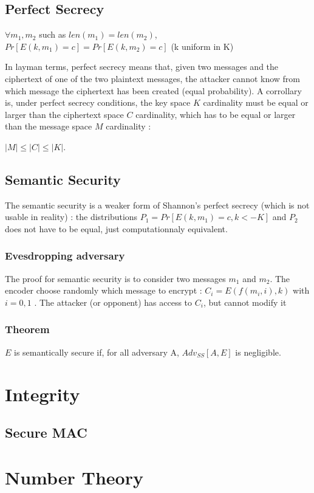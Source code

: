 \subsection{Perfect Secrecy}

\begin{mytheorem}
    $\forall m_1,m_2$ such as $len(m_1) = len(m_2)$, 
    $Pr[E(k,m_1) = c] = Pr[E(k,m_2) = c]$  \flushright (k uniform in K)
\end{mytheorem}

In layman terms, perfect secrecy means that, given two messages and the ciphertext of one of the two plaintext messages, the attacker cannot know from which message the ciphertext has been created (equal probability). A corrollary is, under perfect secrecy conditions, the key space $K$ cardinality must be equal or larger than the ciphertext space $C$ cardinality, which has to be equal or larger than the message space $M$ cardinality :
\begin{mytheorem}
    $ |M| \leq |C| \leq |K| $. 
\end{mytheorem}


\subsection{Semantic Security}

The semantic security is a weaker form of Shannon's perfect secrecy (which is not usable in reality) : the distributions $P_1 = Pr[E(k,m_1) = c , k<- K]$ and $P_2$ does not have to be equal, just computationnaly equivalent.

\subsubsection{Evesdropping adversary}
    The proof for semantic security is to consider two messages $m_1$ and $m_2$. The encoder choose randomly which message to encrypt : $C_i = E( f(m_i,i), k)$ with $i = {0,1}$ .
The attacker (or opponent) has access to $C_i$, but cannot modify it 

\subsubsection{Theorem}

\begin{mytheorem}
    $E$ is semantically secure if, for all adversary A, $Adv_{SS}[A,E]$ is negligible.
\end{mytheorem}


\section{Integrity}
\subsection{Secure MAC}


\section{Number Theory}

